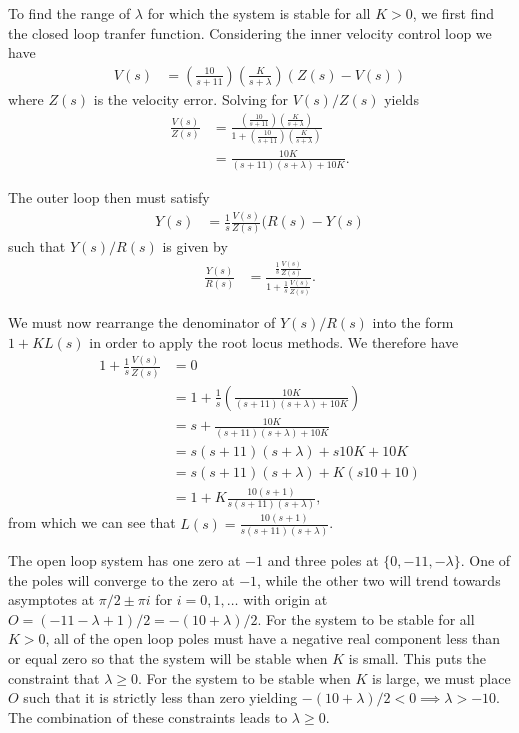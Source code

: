 \documentclass[paper=letter, fontsize=11pt]{scrartcl} %
\numberwithin{equation}{section} %
\numberwithin{figure}{section} %
\numberwithin{table}{section} %
\begin{document}
\section{}
To find the range of $\lambda$ for which the system is stable for all $K > 0$, we first find
the closed loop tranfer function. Considering the inner velocity control loop we have
\begin{align*}
V(s) &= (\frac{10}{s+11})(\frac{K}{s + \lambda})(Z(s) - V(s))
\end{align*}
where $Z(s)$ is the velocity error. Solving for $V(s)/Z(s)$ yields
\begin{align*}
\frac{V(s)}{Z(s)} &= \frac{(\frac{10}{s+11})(\frac{K}{s + \lambda})}{1 + (\frac{10}{s+11})(\frac{K}{s + \lambda})} \\
&= \frac{10K}{(s+11)(s+\lambda) + 10K}.
\end{align*}

The outer loop then must satisfy 
\begin{align*}
Y(s) &= \frac{1}{s}\frac{V(s)}{Z(s)}(R(s) - Y(s)
\end{align*}
such that $Y(s)/R(s)$ is given by
\begin{align*}
\frac{Y(s)}{R(s)} &= \frac{\frac{1}{s}\frac{V(s)}{Z(s)}}{1 + \frac{1}{s}\frac{V(s)}{Z(s)}}.
\end{align*}

We must now rearrange the denominator of $Y(s)/R(s)$ into the form $1 + KL(s)$ in order to apply
the root locus methods. We therefore have
\begin{align*}
1 + \frac{1}{s}\frac{V(s)}{Z(s)} &= 0 \\
&= 1 + \frac{1}{s}\left(\frac{10K}{(s+11)(s+\lambda) + 10K}\right) \\
&= s + \frac{10K}{(s+11)(s+\lambda) + 10K} \\
&= s(s+11)(s+\lambda) + s10K + 10K \\
&= s(s+11)(s+\lambda) + K(s10 + 10) \\
&= 1 + K \frac{10(s + 1)}{s(s+11)(s+\lambda)},
\end{align*}
from which we can see that $L(s) = \frac{10(s + 1)}{s(s+11)(s+\lambda)}$. 

The open loop system has one zero at $-1$ and three poles at $\{0, -11, -\lambda\}$. 
One of the poles will converge to the zero at $-1$, while the other two will trend towards 
asymptotes at $\pi/2 \pm \pi i$ for $i = 0, 1, \ldots$ with origin at $O = (-11 - \lambda + 1)/2 = -(10 + \lambda)/2$.
For the system to be stable for all $K > 0$, all of the open loop poles must have
a negative real component less than or equal zero so that the system will be stable when 
$K$ is small. This puts the constraint that $\lambda \geq 0$. For the system to be stable
when $K$ is large, we must place $O$ such that it is strictly less than zero yielding 
$-(10 + \lambda)/2 < 0 \implies \lambda > -10$. The combination of these constraints leads to 
$\lambda \geq 0$.
\end{document}
